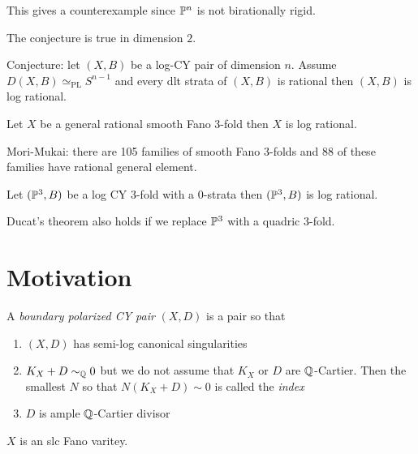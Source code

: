 \documentclass[12pt]{article}
\begin{document}
This gives a counterexample since $\P^n$ is not birationally rigid. 

\begin{theorem}
The conjecture is true in dimension $2$.
\end{theorem}

Conjecture: let $(X,B)$ be a log-CY pair of dimension $n$. Assume $D(X, B) \simeq_{\text{PL}} S^{n-1}$ and every dlt strata of $(X,B)$ is rational then $(X,B)$ is log rational. 

\begin{theorem}
Let $X$ be a general rational smooth Fano 3-fold then $X$ is log rational. 
\end{theorem}

\begin{rmk}
Mori-Mukai: there are 105 families of smooth Fano 3-folds and 88 of these families have rational general element.
\end{rmk}

\begin{theorem}[Ducat, 23]
Let $(\P^3, B)$ be a log CY 3-fold with a 0-strata then $(\P^3, B)$ is log rational. 
\end{theorem}

\begin{theorem}[Loginov-M]
Ducat's theorem also holds if we replace $\P^3$ with a quadric 3-fold. 
\end{theorem}

\section{Motivation}

\begin{defn}
A \textit{boundary polarized CY pair} $(X, D)$ is a pair so that
\begin{enumerate}
\item $(X, D)$ has semi-log canonical singularities
\item $K_X + D \sim_{\Q} 0$ but we do not assume that $K_X$ or $D$ are $\Q$-Cartier. Then the smallest $N$ so that $N(K_X + D) \sim 0$ is called the \textit{index}
\item $D$ is ample $\Q$-Cartier divisor 
\end{enumerate}
\end{defn}

\begin{rmk}
$X$ is an slc Fano varitey. 
\end{rmk}
\end{document}
